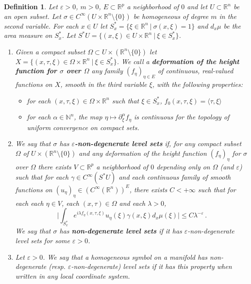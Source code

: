 \documentclass[10pt,twoside]{article}
\newcommand{\eps}{\varepsilon}
\newcommand{\R}{\mathbb{R}}
\newcommand{\N}{\mathbb{N}}
\newcommand{\zeroless}{\setminus\{0\}}
\numberwithin{theorem}{section}
\newtheorem{definition}[theorem]{Definition}
\begin{document}
\begin{definition}\label{d.ndls}
Let $\eps>0$, $m>0$, $E\subset\R^p$ a neighborhood of $0$ and let $U\subset\R^n$ be an open subset. Let $\sigma\in C^\infty(U\times\R^n\zeroless)$ be homogeneous of degree $m$ in the second variable. For each $x\in U$ let $S^*_x =\{\xi\in\R^n\ |\ \sigma(x,\xi)=1\}$ and $d_x\mu$ be the area measure on $S^*_x$. Let $S^*U=\{(x,\xi)\in U\times \R^n\ |\ \xi\in S^*_x\}$.
\begin{enumerate}
\item    Given a compact subset $\Omega\subset U\times(\R^n\zeroless)$ let $X=\{(x,\tau,\xi)\in \Omega\times\R^n\ |\ \xi\in S^*_x\}$. We call a \textbf{deformation of the height function for $\sigma$ over $\Omega$} any family $(f_\eta)_{\eta\in E}$ of continuous, real-valued functions on $X$, smooth in the third variable $\xi$, with the following properties:
\begin{itemize}
\item for each $(x,\tau,\xi)\in \Omega\times \R^n$ such that $\xi\in S^*_x$, $f_0(x,\tau,\xi)=\langle\tau,\xi\rangle$
\item for each $\alpha\in\N^n$, the map $\eta \mapsto \partial^\alpha_\xi f_\eta$ is continuous for the topology of uniform convergence on compact sets.
\end{itemize}
\item We say that $\sigma$ has \textbf{$\eps$-non-degenerate level sets} if, for any compact subset $\Omega$ of $U\times (\R^n\zeroless)$ and any deformation of the height function $(f_\eta)_\eta$ for $\sigma$ over $\Omega$ there exists $V\subset\R^p$ a neighborhood of $0$ depending only on $\Omega$ (and $\eps$) such that for each $\gamma\in C^\infty(S^*U)$ and each continuous family of smooth functions on $(u_\eta)_{\eta}\in \left(C^\infty\left(\R^n\right)\right)^E$, there exists $C<+\infty$ such that for each each $\eta\in V$, each $(x,\tau)\in \Omega$ and each $\lambda>0$,
\begin{equation}\label{e.decay}
\Big|\int_{S^*_x}e^{i\lambda f_\eta(x,\tau,\xi)}u_\eta(\xi)\gamma(x,\xi)d_x\mu(\xi)\Big|\leq C\lambda^{-\eps}\, .
\end{equation}
We say that $\sigma$ has \textbf{non-degenerate level sets} if it has $\eps$-non-degenerate level sets for some $\eps>0$.
\item Let $\eps>0$. We say that a homogeneous symbol on a manifold has non-degenerate (resp. $\eps$-non-degenerate) level sets if it has this property when written in any local coordinate system.
  \end{enumerate}
\end{definition}
\end{document}
